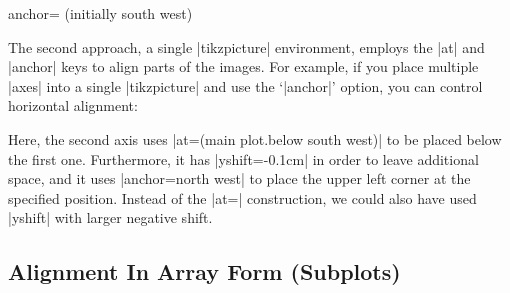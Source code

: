 \begin{pgfplotskey}{anchor= (initially south west)}
\begin{minipage}
\begin{tabular}
    The second approach, a single |tikzpicture| environment, employs the |at|
    and |anchor| keys to align parts of the images. For example, if you place
    multiple |axes| into a single |tikzpicture| and use the `|anchor|' option,
    you can control horizontal alignment:
%
\begin{codeexample}[]
\end{codeexample}

    Here, the second axis uses |at={(main plot.below south west)}| to be placed
    below the first one. Furthermore, it has |yshift=-0.1cm| in order to leave
    additional space, and it uses |anchor=north west| to place the upper left
    corner at the specified position. Instead of the |at={}| construction, we
    could also have used |yshift| with larger negative shift.


    \subsection{Alignment In Array Form (Subplots)}
    \label{sec:pgfplots:arrayform}



\end{tabular}
\end{minipage}
\end{pgfplotskey}
